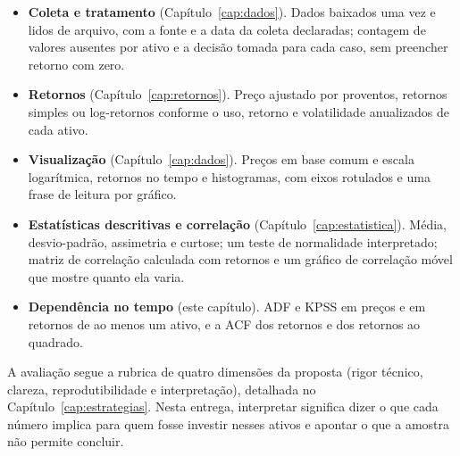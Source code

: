 \begin{itemize}
  \item \textbf{Coleta e tratamento} (Capítulo~\ref{cap:dados}). Dados baixados uma vez e lidos de arquivo, com a fonte e a data da coleta declaradas; contagem de valores ausentes por ativo e a decisão tomada para cada caso, sem preencher retorno com zero.
  \item \textbf{Retornos} (Capítulo~\ref{cap:retornos}). Preço ajustado por proventos, retornos simples ou log-retornos conforme o uso, retorno e volatilidade anualizados de cada ativo.
  \item \textbf{Visualização} (Capítulo~\ref{cap:dados}). Preços em base comum e escala logarítmica, retornos no tempo e histogramas, com eixos rotulados e uma frase de leitura por gráfico.
  \item \textbf{Estatísticas descritivas e correlação} (Capítulo~\ref{cap:estatistica}). Média, desvio-padrão, assimetria e curtose; um teste de normalidade interpretado; matriz de correlação calculada com retornos e um gráfico de correlação móvel que mostre quanto ela varia.
  \item \textbf{Dependência no tempo} (este capítulo). ADF e KPSS em preços e em retornos de ao menos um ativo, e a ACF dos retornos e dos retornos ao quadrado.
\end{itemize}

A avaliação segue a rubrica de quatro dimensões da proposta (rigor técnico, clareza, reprodutibilidade e interpretação), detalhada no Capítulo~\ref{cap:estrategias}. Nesta entrega, interpretar significa dizer o que cada número implica para quem fosse investir nesses ativos e apontar o que a amostra não permite concluir.

